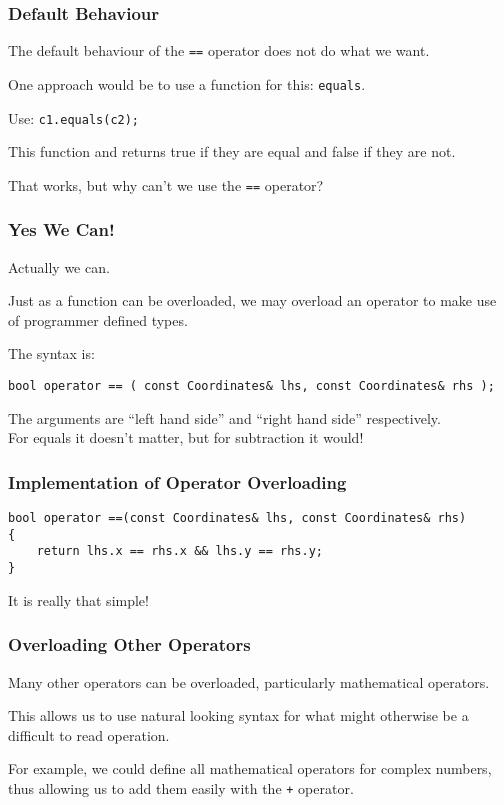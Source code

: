 \begin{frame}
\frametitle{Default Behaviour}

The default behaviour of the \texttt{==} operator does not do what we want.

One approach would be to use a function for this: \texttt{equals}.

Use: \texttt{c1.equals(c2);}

This function and returns true if they are equal and false if they are not.

That works, but why can't we use the \texttt{==} operator?

\end{frame}



\begin{frame}
\frametitle{Yes We Can!}

Actually we can. 

Just as a function can be overloaded, we may overload an operator to make use of programmer defined types.

The syntax is:

\texttt{bool operator == ( const Coordinates\& lhs, const Coordinates\& rhs );}

The arguments are ``left hand side'' and ``right hand side'' respectively.\\
\quad For equals it doesn't matter, but for subtraction it would!

\end{frame}




\begin{frame}[fragile]
\frametitle{Implementation of Operator Overloading}

{\small
\begin{verbatim}
bool operator ==(const Coordinates& lhs, const Coordinates& rhs) 
{
    return lhs.x == rhs.x && lhs.y == rhs.y;
}
\end{verbatim}
}

It is really that simple!

\end{frame}



\begin{frame}
\frametitle{Overloading Other Operators}

Many other operators can be overloaded, particularly mathematical operators. 

This allows us to use natural looking syntax for what might otherwise be a difficult to read operation.

For example, we could define all mathematical operators for complex numbers, thus allowing us to add them easily with the \texttt{+} operator.


\end{frame}




